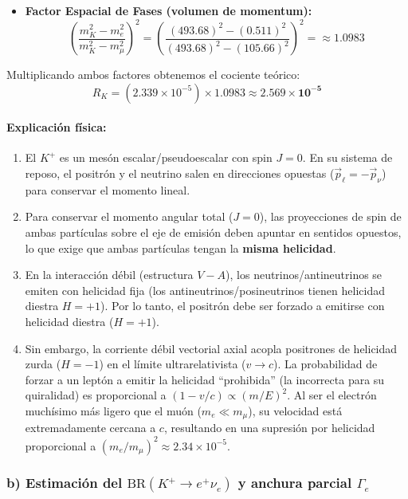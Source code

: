 \begin{problema}
\begin{itemize}
    \item \textbf{Factor Espacial de Fases (volumen de momentum):}
    \begin{equation*}
    \left( \frac{m_K^2 - m_e^2}{m_K^2 - m_\mu^2} \right)^2 = \left( \frac{(493.68)^2 - (0.511)^2}{(493.68)^2 - (105.66)^2} \right)^2 = \approx 1.0983
    \end{equation*}
\end{itemize}

Multiplicando ambos factores obtenemos el cociente teórico:
\begin{equation*}
R_K = (2.339 \times 10^{-5}) \times 1.0983 \approx \mathbf{2.569 \times 10^{-5}}
\end{equation*}

\paragraph{Explicación física:}
\begin{enumerate}
    \item El $K^+$ es un mesón escalar/pseudoescalar con spin $J=0$. En su sistema de reposo, el positrón y el neutrino salen en direcciones opuestas ($\vec{p}_{\ell} = -\vec{p}_\nu$) para conservar el momento lineal.
    \item Para conservar el momento angular total ($J=0$), las proyecciones de spin de ambas partículas sobre el eje de emisión deben apuntar en sentidos opuestos, lo que exige que ambas partículas tengan la \textbf{misma helicidad}.
    \item En la interacción débil (estructura $V - A$), los neutrinos/antineutrinos se emiten con helicidad fija (los antineutrinos/posineutrinos tienen helicidad diestra $H=+1$). Por lo tanto, el positrón debe ser forzado a emitirse con helicidad diestra ($H=+1$).
    \item Sin embargo, la corriente débil vectorial axial acopla positrones de helicidad zurda ($H=-1$) en el límite ultrarelativista ($v \to c$). La probabilidad de forzar a un leptón a emitir la helicidad ``prohibida'' (la incorrecta para su quiralidad) es proporcional a $(1 - v/c) \propto (m/E)^2$. Al ser el electrón muchísimo más ligero que el muón ($m_e \ll m_\mu$), su velocidad está extremadamente cercana a $c$, resultando en una supresión por helicidad proporcional a $(m_e/m_\mu)^2 \approx 2.34 \times 10^{-5}$.
\end{enumerate}

\subsubsection*{b) Estimación del $\text{BR}(K^+ \to e^+ \nu_e)$ y anchura parcial $\Gamma_e$}


\end{problema}

